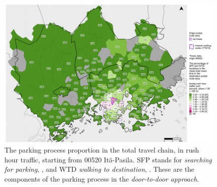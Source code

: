 
\begin{figure}
    \section{}
    \centering
    \includegraphics[trim={0.9cm 0.3cm 0.25cm 0.3cm},clip,width=\textwidth]{images/compare_traveltimes_mapfill-msc_r_pct_fromzip-00520_15-10-2020.png}
    \caption[Parking process proportion from Itä-Pasila, rush hour traffic]{The parking process proportion in the total travel chain, in rush hour traffic, starting from 00520 Itä-Pasila. SFP stands for \textit{searching for parking}, , and WTD \textit{walking to destination}, . These are the components of the parking process in the \textit{door-to-door approach}.}%
    \label{fig:compare_msc_r_pct_00520}%
\end{figure}

